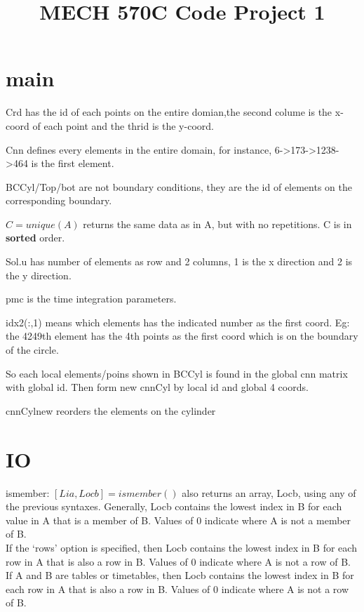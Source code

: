 \documentclass[a4paper,12pt]{article} %
\begin{document}
\title{MECH 570C Code Project 1}
\maketitle


\section{main}
Crd has the id of each points on the entire domian,the second colume is the x-coord of each point and the thrid is the y-coord.

Cnn defines every elements in the entire domain, for instance, 6->173->1238->464 is the first element.

BCCyl/Top/bot are not boundary conditions, they are the id of elements on the corresponding boundary.

$C = unique(A)$ returns the same data as in A, but with no repetitions. C is in \textbf{sorted} order.

Sol.u has number of elements as row and 2 columns, 1 is the x direction and 2 is the y direction.

pmc is the time integration parameters.

idx2(:,1) means which elements has the indicated number as the first coord. Eg: the 4249th element has the 4th points as the first coord which is on
the boundary of the circle. 

So each local elements/poins shown in BCCyl is found in the global cnn matrix with global id. Then form new cnnCyl by local id and
global 4 coords.

cnnCylnew reorders the elements on the cylinder 

\section{IO}
ismember: $[Lia,Locb] = ismember()$ also returns an array, Locb, using any of the previous syntaxes.
Generally, Locb contains the lowest index in B for each value in A that is a member of B. Values of 0 indicate where A is not a member of B.\\
If the `rows' option is specified, then Locb contains the lowest index in B for each row in A that is also a row in B. Values of 0 indicate where A is not a row of B.\\
If A and B are tables or timetables, then Locb contains the lowest index in B for each row in A that is also a row in B. Values of 0 indicate where A is not a row of B.
\end{document}
